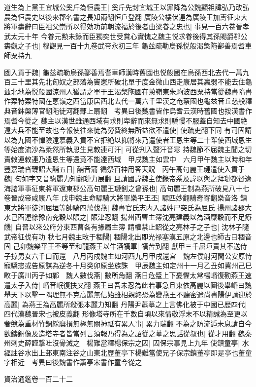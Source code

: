 道生為上黨王宜城公奚斤為恒農王|{
	奚斤先封宜城王以罪降為公魏顯祖諱弘乃改弘農為恒農史以後來郡名書之長知兩翻恒戶登翻}
廣陵公樓伏連為廣陵王加夀征東大將軍夀辭曰臣祖父崇所以得効功前朝流福於後者由梁眷之忠也|{
	事見一百六卷晉孝武太元十年}
今眷元勲未錄而臣獨奕世受賞心實愧之魏主悦求眷後得其孫賜爵郡公夀觀之子也|{
	穆觀見一百十九卷武帝永初三年}
龜兹疏勒烏孫悦般渇槃陁鄯善焉耆車師粟持九

國入貢于魏|{
	龜兹疏勒烏孫鄯善焉耆車師漢時舊國也悦般國在烏孫西北去代一萬九百三十里其先北匈奴之部落為竇憲所破北單于度金微山西走康居其羸弱不能去住龜兹北地為悦般國涼州人猶謂之單于王渴槃陁國在蔥嶺東朱駒波西粟持當從魏書隋書作粟特粟特國在蔥嶺之西當康居西北去代一萬六千里漢之奄蔡國也龜兹音丘慈般釋典音鉢槃薄官翻陁徒河翻鄯上扇翻　考異曰後魏書皆作烏耆云漢時舊國也按漢書作焉耆今從之}
魏主以漢世雖通西域有求則卑辭而來無求則驕慢不服蓋自知去中國絶遠大兵不能至故也今報使往來徒為勞費終無所益欲不遣使|{
	使疏吏翻下同}
有司固請以為九國不憚險遠慕義入貢不宜拒絶以抑將來乃遣使者王恩生等二十輩使西域恩生等始度流沙為柔然所執恩生見敇連可汗|{
	可從刋入聲汗音寒}
持魏節不屈魏主聞之切責敇連敇連乃遣恩生等還竟不能達西域　甲戌魏主如雲中　六月甲午魏主以時和年豐嘉瑞沓臻詔大酺五日|{
	酺音蒲}
徧祭百神用答天貺　丙午高句麗王璉遣使入貢于魏|{
	句如字又音駒麗力知翻璉力展翻}
且請國諱魏主使錄帝系及諱以與之拜璉都督遼海諸軍事征東將軍遼東郡公高句麗王璉釗之曾孫也|{
	高句麗王制為燕所破見八十七卷晉成帝咸康八年}
戊申魏主命驃騎大將軍樂平王丕|{
	驃匹妙翻騎奇寄翻樂音洛}
鎮東大將軍徒河屈垣等帥騎四萬伐燕|{
	魏書官氏志内入諸姓尸突氏為屈氏}
揚州諸郡大水己酉運徐豫南兖穀以賑之|{
	賑津忍翻}
揚州西曹主簿沈亮建義以為酒糜穀而不足療饑|{
	自晉以來公府分東西曹各有掾屬主簿}
請權禁止詔從之亮林子之子也|{
	沈林子隨武帝征伐有功}
秋七月魏主畋于稒陽|{
	稒陽北出即光禄塞漢五原之北邊也師古曰稒音固}
己卯魏樂平王丕等至和龍燕王以牛酒犒軍|{
	犒苦到翻}
獻甲三千屈垣責其不送侍子掠男女六千口而還　八月丙戍魏主如河西九月甲戌還宮　魏左僕射河間公安原恃寵驕恣或告原謀為逆冬十月癸卯原坐族誅　甲辰魏主如定州十一月乙丑如冀州己巳畋于廣川丙子如鄴　魏人數伐燕|{
	數所角翻}
燕日危蹙上下憂懼太常楊㟭復勸燕王速遣太子入侍|{
	㟭音岷復扶又翻}
燕王曰吾未忍為此若事急且東依高麗以圖後舉㟭曰魏舉天下以擊一隅理無不克高麗無信始雖相親終恐為變燕王不聽密遣尚書陽伊請迎於高麗|{
	為燕王為高麗所殺張本麗力知翻}
丹陽尹蕭摹之上言佛化被于中國已歷四代|{
	四代漢魏晉宋也被皮義翻}
形像塔寺所在千數自頃以來情敬浮末不以精誠為至更以奢競為重材竹銅綵糜損無極無關神祗有累人事|{
	累力瑞翻}
不為之防流遁未息請自今欲鑄銅像及造塔寺者皆當列言須報乃得為之詔從之摹之思話從叔也|{
	從才用翻}
魏秦州刺史薛謹撃吐沒骨滅之　楊難當釋楊保宗之囚|{
	囚保宗事見上九年}
使鎮童亭|{
	水經註谷水出上邽東南注谷之山東北歷董亭下楊難當使兄子保宗鎮董亭即是亭也董童字相近　考異曰後魏書作薰亭宋書作童今從之}


資治通鑑卷一百二十二
